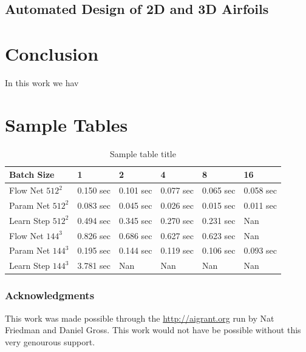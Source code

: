 \documentclass{article} %
\begin{document}
\subsection{Automated Design of 2D and 3D Airfoils}


\section{Conclusion}

In this work we hav


\section{Sample Tables}

\begin{table}[t]
\caption{Sample table title}
\label{sample-table}
\begin{center}
\begin{tabular}{l|lllll}
Batch Size & 1 & 2 & 4 & 8 & 16 \\ \hline 
Flow Net $512^2$ & 0.150 sec & 0.101 sec & 0.077 sec & 0.065 sec & 0.058 sec \\ 
Param Net $512^2$ & 0.083 sec & 0.045 sec & 0.026 sec & 0.015 sec & 0.011 sec \\ 
Learn Step $512^2$ & 0.494 sec & 0.345 sec & 0.270 sec & 0.231 sec & Nan \\ 
Flow Net $144^3$ & 0.826 sec & 0.686 sec & 0.627 sec & 0.623 sec & Nan \\ 
Param Net $144^3$ & 0.195 sec & 0.144 sec & 0.119 sec & 0.106 sec & 0.093 sec \\ 
Learn Step $144^3$ & 3.781 sec & Nan & Nan & Nan & Nan \\ 
\end{tabular}
\end{center}
\end{table}


\subsubsection*{Acknowledgments}

This work was made possible through the \url{http://aigrant.org} run by Nat Friedman and Daniel Gross. This work would not have be possible without this very genourous support.



\end{document}
